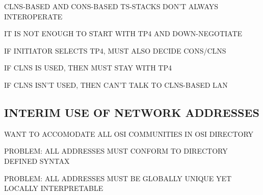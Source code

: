 \begin{bwslide}

\begin{nrtc}
\item	CLNS-BASED AND CONS-BASED TS-STACKS DON'T ALWAYS INTEROPERATE
    \begin{nrtc}
    \item	IT IS NOT ENOUGH TO START WITH TP4 AND DOWN-NEGOTIATE
    \end{nrtc}
\end{nrtc}

\end{bwslide}


\begin{bwslide}

\begin{nrtc}
\item	IF INITIATOR SELECTS TP4, MUST ALSO DECIDE CONS/CLNS
    \begin{nrtc}
    \item	IF CLNS IS USED, THEN MUST STAY WITH TP4

    \item	IF CLNS ISN'T USED, THEN CAN'T TALK TO CLNS-BASED LAN    
    \end{nrtc}
\end{nrtc}
\end{bwslide}


\begin{bwslide}
\part*	{INTERIM USE OF NETWORK ADDRESSES}\bf

\begin{nrtc}
\item	WANT TO ACCOMODATE ALL OSI COMMUNITIES IN OSI DIRECTORY

\item	PROBLEM: ALL ADDRESSES MUST CONFORM TO DIRECTORY DEFINED SYNTAX

\item	PROBLEM: ALL ADDRESSES MUST BE GLOBALLY UNIQUE YET LOCALLY
	INTERPRETABLE
\end{nrtc}
\end{bwslide}


